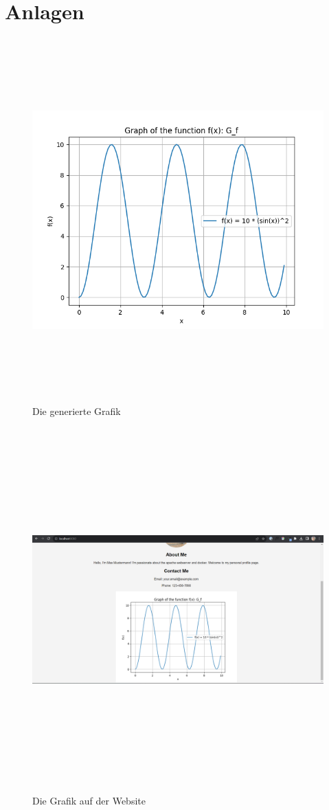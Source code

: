 \documentclass[a4paper,11pt,titlepage]{article}
\begin{document}
    \section{Anlagen}
    \begin{figure}[h]
        \centering
        \includegraphics[width=15cm,height=14cm,keepaspectratio]{./images/function}
        \caption{Die generierte Grafik}
        \label{fig:function}
    \end{figure}

    \begin{figure}[h]
        \centering
        \includegraphics[width=15cm,height=14cm,keepaspectratio]{./images/screen2}
        \caption{Die Grafik auf der Website}
        \label{fig:screen2}
    \end{figure}
\end{document}
